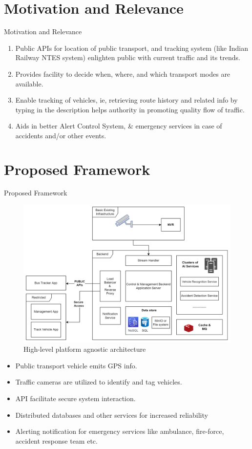 \documentclass{beamer}
\begin{document}
\section{Motivation and Relevance}
\begin{frame}{Motivation and Relevance}
	\begin{enumerate}
	    \item Public APIs for location of public transport, and tracking system (like Indian Railway NTES system) enlighten public with current traffic and its trends.
	    \item Provides facility to decide when, where, and which transport modes are available.
		\item Enable tracking of vehicles, ie, retrieving route history and related info by typing in the description helps authority in promoting quality flow of traffic.
		\item Aids in better Alert Control System, \& emergency services in case of accidents and/or other events.
		
	\end{enumerate}
\end{frame}


\section{Proposed Framework}
\begin{frame}{Proposed Framework}
	\begin{figure}
        \includegraphics[width=0.8\linewidth]{res/architecture.png}
        \caption{High-level platform agnostic architecture}
    \end{figure}
\end{frame}

\begin{frame}
	\begin{itemize}
		\item Public transport vehicle emits GPS info.
		\item Traffic cameras are utilized to identify and tag vehicles.
		\item API facilitate secure system interaction.
		\item Distributed databases and other services for increased reliability
		\item Alerting notification for emergency services like ambulance, fire-force, accident response team etc.
	\end{itemize}
\end{frame}
\end{document}
